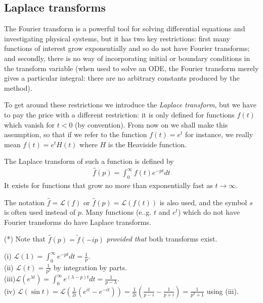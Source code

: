 \documentclass[a4paper]{article}
\begin{document}
\subsection{Laplace transforms}
The Fourier transform is a powerful tool for solving differential equations and investigating physical systems, but it has two key restrictions: first many functions of interest grow exponentially and so do not have Fourier transforms; and secondly, there is no way of incorporating initial or boundary conditions in the transform variable (when used to solve an ODE, the Fourier transform merely gives a particular integral: there are no arbitrary constants produced by the method).

To get around these restrictions we introduce the \emph{Laplace transform}, but we have to pay the price with a different restriction: it is only defined for functions $f(t)$ which vanish for $t<0$ (by convention). From now on we shall make this assumption, so that if we refer to the function $f(t) = e^t$ for instance, we really mean $f(t) = e^tH(t)$ where $H$ is the Heaviside function.

The Laplace transform of such a function is defined by 
\begin{equation*}
\begin{aligned}
\hat{f}(p) = \int_0^\infty f(t) e^{-pt} dt
\end{aligned}
\end{equation*}
It exists for functions that grow no more than exponentially fast as $t \to \infty$.

The notation $\hat{f} = \mathcal{L}(f)$ or $\hat{f}(p) = \mathcal{L}(f(t))$ is also used, and the symbol $s$ is often used instead of $p$. Many functions (e..g. $t$ and $e^t$) which do not have Fourier transforms do have Laplace transforms.

(*) Note that $\hat{f}(p) = \tilde{f}(-ip)$ \emph{provided that} both transforms exist.

\begin{eg}
(i) $\mathcal{L}(1) = \int_0^\infty e^{-pt} dt = \frac{1}{p}$.\\
(ii) $\mathcal{L}(t) = \frac{1}{p^2}$ by integration by parts.\\
(iii)$\mathcal{L}(e^{\lambda t}) = \int_0^\infty e^{(\lambda-p)t} dt = \frac{1}{p-\lambda}$.\\
(iv) $\mathcal{L}(\sin t) = \mathcal{L}(\frac{1}{2i}(e^{it} - e^{-it})) = \frac{1}{2i}\left(\frac{1}{p-i}-\frac{1}{p+i}\right) = \frac{1}{p^2+1}$ using (iii).
\end{eg}
\end{document}
